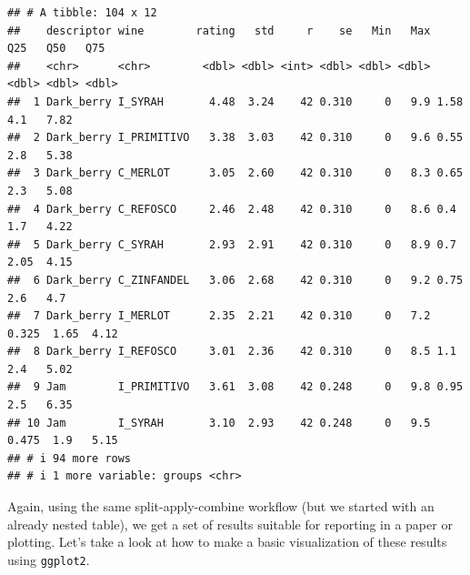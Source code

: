 \documentclass[
]{book}
\begin{document}
\begin{verbatim}
## # A tibble: 104 x 12
##    descriptor wine        rating   std     r    se   Min   Max   Q25   Q50   Q75
##    <chr>      <chr>        <dbl> <dbl> <int> <dbl> <dbl> <dbl> <dbl> <dbl> <dbl>
##  1 Dark_berry I_SYRAH       4.48  3.24    42 0.310     0   9.9 1.58   4.1   7.82
##  2 Dark_berry I_PRIMITIVO   3.38  3.03    42 0.310     0   9.6 0.55   2.8   5.38
##  3 Dark_berry C_MERLOT      3.05  2.60    42 0.310     0   8.3 0.65   2.3   5.08
##  4 Dark_berry C_REFOSCO     2.46  2.48    42 0.310     0   8.6 0.4    1.7   4.22
##  5 Dark_berry C_SYRAH       2.93  2.91    42 0.310     0   8.9 0.7    2.05  4.15
##  6 Dark_berry C_ZINFANDEL   3.06  2.68    42 0.310     0   9.2 0.75   2.6   4.7 
##  7 Dark_berry I_MERLOT      2.35  2.21    42 0.310     0   7.2 0.325  1.65  4.12
##  8 Dark_berry I_REFOSCO     3.01  2.36    42 0.310     0   8.5 1.1    2.4   5.02
##  9 Jam        I_PRIMITIVO   3.61  3.08    42 0.248     0   9.8 0.95   2.5   6.35
## 10 Jam        I_SYRAH       3.10  2.93    42 0.248     0   9.5 0.475  1.9   5.15
## # i 94 more rows
## # i 1 more variable: groups <chr>
\end{verbatim}

Again, using the same split-apply-combine workflow (but we started with an already nested table), we get a set of results suitable for reporting in a paper or plotting. Let's take a look at how to make a basic visualization of these results using \texttt{ggplot2}.
\end{document}
